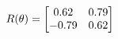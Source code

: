 \documentclass[preview]{standalone}
\begin{document}
\begin{align*}
\special{dvisvgm:raw <g id='unique000'>}R(\theta) = \begin{bmatrix}0.62 & 0.79\\-0.79 & 0.62\end{bmatrix}\special{dvisvgm:raw </g>}
\end{align*}
\end{document}

